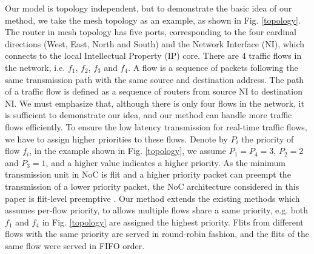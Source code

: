 \documentclass[10pt,journal]{IEEEtran}
\begin{document}
Our model is topology independent, but to demonstrate the basic idea of our method, we take the mesh topology as an example, as shown in Fig. \ref{topology}. The router in mesh topology has five ports, corresponding to the four cardinal directions (West, East, North and South) and the Network Interface (NI), which connects to the local Intellectual Property (IP) core. There are 4 traffic flows in the network, i.e. $f_1$, $f_2$, $f_3$ and $f_4$. A flow is a sequence of packets following the same transmission path with the same source and destination address. The path of a traffic flow is defined as a sequence of routers from source NI to destination NI. We must emphasize that, although there is only four flows in the network, it is sufficient to demonstrate our idea, and our method can handle more traffic flows efficiently. To ensure the low latency transmission for real-time traffic flows, we have to assign higher priorities to these flows. Denote by $P_i$ the priority of flow $f_i$, in the example shown in Fig. \ref{topology}, we assume $P_1=P_4=3$, $P_2=2$ and $P_3=1$, and a higher value indicates a higher priority. As the minimum transmission unit in NoC is flit and a higher priority packet can preempt the transmission of a lower priority packet, the NoC architecture considered in this paper is flit-level preemptive \cite{Lee:2003:RWC:846077.846083}. Our method extends the existing methods \cite{73}\cite{Qian489900} which assumes per-flow priority, to allows multiple flows share a same priority, e.g. both $f_1$ and $f_4$ in Fig. \ref{topology} are assigned the highest priority. Flits from different flows with the same priority are served in round-robin fashion, and the flits of the same flow were served in FIFO order.
\end{document}
